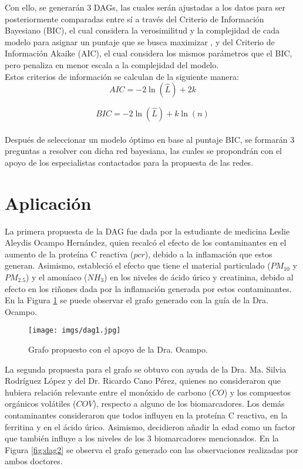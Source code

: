 \documentclass[12pt, letterpaper]{report}
\begin{document}
Con ello, se generarán 3 DAGs, las cuales serán ajustadas a los datos para ser posteriormente comparadas entre sí a través del Criterio de Información Bayesiano (BIC), el cual considera la verosimilitud y la complejidad de cada modelo para asignar un puntaje que se busca maximizar  \cite{scutari2021bayesian}, y del Criterio de Información Akaike (AIC), el cual considera los mismos parámetros que el BIC, pero penaliza en menor escala a la complejidad del modelo.
\\

Estos criterios de información se calculan de la siguiente manera:
\\
\begin{equation}
AIC = -2 \ln(\hat{L}) + 2k
\label{eq:aic}
\end{equation}

\begin{equation}
BIC = -2 \ln(\hat{L}) + k \ln(n)
\label{eq:bic}
\end{equation}
\\
Después de seleccionar un modelo óptimo en base al puntaje BIC, se formarán 3 preguntas a resolver con dicha red bayesiana, las cuales se propondrán con el apoyo de los especialistas contactados para la propuesta de las redes.

\section*{Aplicación}

La primera propuesta de la DAG fue dada por la estudiante de medicina Leslie Aleydis Ocampo Hernández, quien recalcó el efecto de los contaminantes en el aumento de la proteína C reactiva ($pcr$), debido a la inflamación que estos generan. Asimismo, estableció el efecto que tiene el material particulado ($PM_{10}$ y $PM_{2.5}$) y el amoníaco ($NH_3$) en los niveles de ácido úrico y creatinina, debido al efecto en los riñones dada por la inflamación generada por estos contaminantes. En la Figura \ref{fig:dag1} se puede observar el grafo generado con la guía de la Dra. Ocampo.

\begin{figure}[H]
    \centering
    \texttt{[image: imgs/dag1.jpg]}
    \caption{Grafo propuesto con el apoyo de la Dra. Ocampo.}
    \label{fig:dag1}
\end{figure}

La segunda propuesta para el grafo se obtuvo con ayuda de la Dra. Ma. Silvia Rodríguez López y del Dr. Ricardo Cano Pérez, quienes no consideraron que hubiera relación relevante entre el monóxido de carbono ($CO$) y los compuestos orgánicos volátiles ($COV$), respecto a alguno de los biomarcadores. Los demás contaminantes consideraron que todos influyen en la proteína C reactiva, en la ferritina y en el ácido úrico. Asimismo, decidieron añadir la edad como un factor que también influye a los niveles de los 3 biomarcadores mencionados. En la Figura \ref{fig:dag2} se observa el grafo generado con las observaciones realizadas por ambos doctores.
\end{document}
